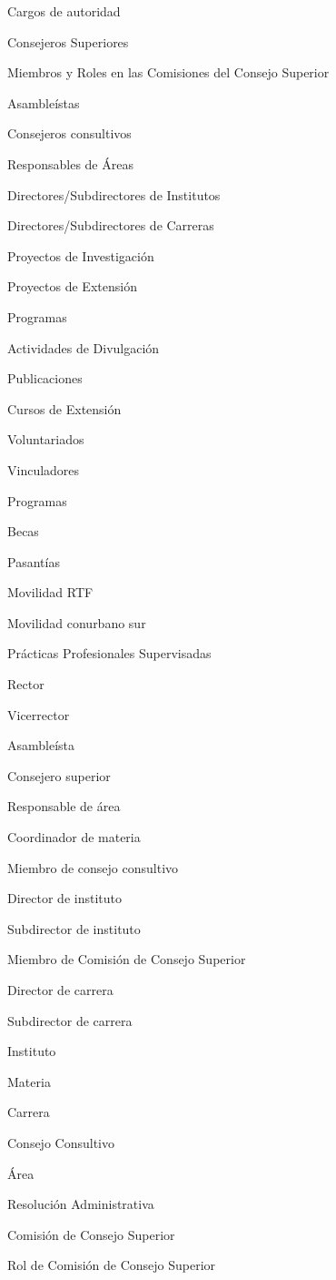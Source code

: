     \item Cargos de autoridad
    \item Consejeros Superiores
    \item Miembros y Roles en las Comisiones del Consejo Superior
    \item Asambleístas
    \item Consejeros consultivos
    \item Responsables de Áreas
    \item Directores/Subdirectores de Institutos
    \item Directores/Subdirectores de Carreras
    \item Proyectos de Investigación
    \item Proyectos de Extensión
    \item Programas
    \item Actividades de Divulgación
    \item Publicaciones
    \item Cursos de Extensión
    \item Voluntariados
    \item Vinculadores
    \item Programas
    \item Becas
    \item Pasantías
    \item Movilidad RTF
    \item Movilidad conurbano sur
    \item Prácticas Profesionales Supervisadas
    \item Rector
    \item Vicerrector
    \item Asambleísta
    \item Consejero superior
    \item Responsable de área
    \item Coordinador de materia
    \item Miembro de consejo consultivo
    \item Director de instituto
    \item Subdirector de instituto
    \item Miembro de Comisión de Consejo Superior
    \item Director de carrera
    \item Subdirector de carrera
    \item Instituto
    \item Materia
    \item Carrera
    \item Consejo Consultivo
    \item Área
    \item Resolución Administrativa
    \item Comisión de Consejo Superior
    \item Rol de Comisión de Consejo Superior


